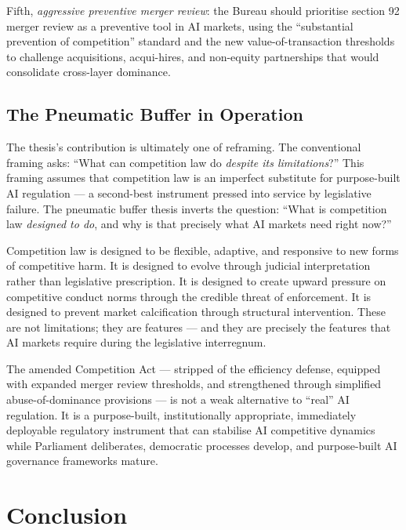 Fifth, \textit{aggressive preventive merger review}: the Bureau should prioritise section 92 merger review as a preventive tool in AI markets, using the ``substantial prevention of competition'' standard and the new value-of-transaction thresholds to challenge acquisitions, acqui-hires, and non-equity partnerships that would consolidate cross-layer dominance.

\subsection{The Pneumatic Buffer in Operation}

The thesis's contribution is ultimately one of reframing. The conventional framing asks: ``What can competition law do \textit{despite its limitations}?'' This framing assumes that competition law is an imperfect substitute for purpose-built AI regulation --- a second-best instrument pressed into service by legislative failure. The pneumatic buffer thesis inverts the question: ``What is competition law \textit{designed to do}, and why is that precisely what AI markets need right now?''

Competition law is designed to be flexible, adaptive, and responsive to new forms of competitive harm. It is designed to evolve through judicial interpretation rather than legislative prescription. It is designed to create upward pressure on competitive conduct norms through the credible threat of enforcement. It is designed to prevent market calcification through structural intervention. These are not limitations; they are features --- and they are precisely the features that AI markets require during the legislative interregnum.

The amended Competition Act --- stripped of the efficiency defense, equipped with expanded merger review thresholds, and strengthened through simplified abuse-of-dominance provisions --- is not a weak alternative to ``real'' AI regulation. It is a purpose-built, institutionally appropriate, immediately deployable regulatory instrument that can stabilise AI competitive dynamics while Parliament deliberates, democratic processes develop, and purpose-built AI governance frameworks mature.


\section{Conclusion}
\label{sec:conclusion}

